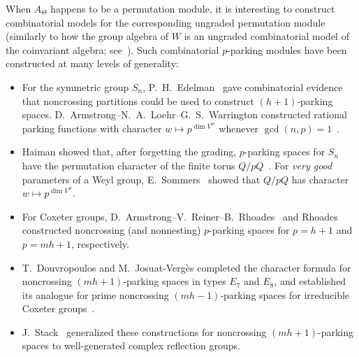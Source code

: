 \documentclass[11pt]{amsart}
\theoremstyle{definition}
\begin{document}
When $A_\Theta$ happens to be a permutation module, it is interesting to construct combinatorial models for the corresponding ungraded permutation module (similarly to how the group algebra of $W$ is an ungraded combinatorial model of the coinvariant algebra; see~).  Such combinatorial $p$-parking modules have been constructed at many levels of generality:

\begin{itemize}
\item For the symmetric group $S_n$, P.~H.~Edelman~\cite{Edelman} gave combinatorial evidence that noncrossing partitions could be used to construct $(h+1)$-parking spaces.  %
  D.~Armstrong--N.~A.~Loehr--G.~S.~Warrington constructed rational parking functions with character $w\mapsto p^{\dim V^w}$ whenever $\gcd(n,p)=1$~\cite[Theorem~3 and Corollary~4]{ALWRational}.  %
\item Haiman showed that, after forgetting the grading, $p$-parking spaces for $S_n$ have the permutation character of the finite torus $Q/pQ$~\cite{Haiman}.  For \emph{very good}
parameters of a Weyl group, E.~Sommers~\cite[Proposition 3.9]{Sommers} showed
that $Q/pQ$ has character $w\mapsto p^{\dim V^w}$.
\item For Coxeter groups, D.~Armstrong--V.~Reiner--B.~Rhoades~\cite{ARR} and
Rhoades~\cite{RhoadesFuss} constructed noncrossing (and nonnesting) $p$-parking spaces for $p=h+1$ and $p=mh+1$, respectively. 
\item T.~Douvropoulos and M.~Josuat-Verg\`es completed the character
formula for noncrossing $(mh+1)$-parking spaces in types $E_7$ and $E_8$,
and established its analogue for prime noncrossing $(mh-1)$-parking
spaces for irreducible Coxeter groups~\cite[Theorems~3.10 and~3.12]{DJVRefined}.
\item J.~Stack~\cite{StackParking} generalized these constructions for noncrossing $(mh+1)$-parking spaces to well-generated complex reflection groups.
\end{itemize}
\end{document}
